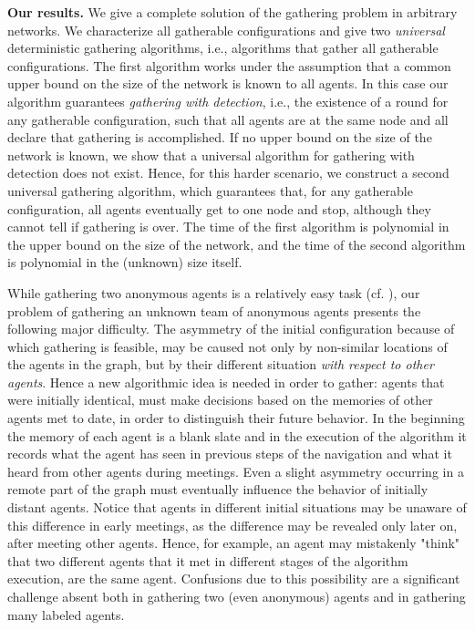 \documentclass[11pt]{article}
\begin{document}
\noindent
{\bf Our results.}
We give a complete solution of the gathering problem in arbitrary networks. We characterize all gatherable configurations and give two {\em universal} deterministic 
gathering algorithms, i.e., algorithms that gather all gatherable configurations. The first algorithm works under the assumption that a common upper bound 
on the size of the network is known to all agents. In this case our algorithm guarantees {\em gathering with detection}, i.e., the existence of a round 
for any gatherable configuration, such that  all agents are at the
same node and all declare that gathering is accomplished. If no upper bound on the size of the network is known, we show that a universal algorithm for gathering
with detection does not exist. Hence, for this harder scenario, we construct a second universal gathering algorithm, which guarantees that, for any gatherable
configuration, all agents eventually get to one node and stop, although they cannot tell if gathering is over. The time of the first algorithm is polynomial in the
upper bound  on the size of the network, and the time of the second algorithm is polynomial in the (unknown) size itself.

While gathering two anonymous agents is a relatively easy task (cf. \cite{CKP}),
our problem of gathering an unknown team of anonymous agents  
presents the following major difficulty. The asymmetry of the initial configuration
because of which gathering is feasible, may be caused not only by non-similar locations
of the agents in the graph, but by their different situation {\em with respect to other agents}.
Hence a new algorithmic idea is needed in order to gather: agents
that were initially identical, must make decisions based on the memories
of other agents met to date, in order to distinguish their future behavior. 
In the beginning the memory of each agent is a blank slate and
in the execution of the algorithm it records what the agent has seen in 
previous steps of the navigation and what it heard from other agents during meetings.
Even a slight asymmetry occurring  in a remote part of the graph
must eventually influence the behavior of initially distant agents.
Notice that agents in different initial situations may be unaware of this difference in early meetings, as the difference
may be revealed only later on, after meeting other agents. Hence, for example,  an agent may mistakenly "think" that two different agents
that it met in different stages of the algorithm execution, are the same agent. 
Confusions due to this possibility are a significant
challenge absent both in gathering two (even anonymous) agents and in gathering many labeled agents. 
\end{document}
